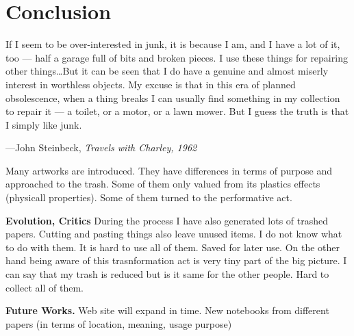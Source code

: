 \chapter{Conclusion}





%
%
\epigraph{If I seem to be over-interested in junk, it is because I am, and I have a lot of it, too --- half a garage full of bits and broken pieces. I use these things for repairing other things\ldots But it can be seen that I do have a genuine and almost miserly interest in worthless objects. My excuse is that in this era of planned obsolescence, when a thing breaks I can usually find something in my collection to repair it --- a toilet, or a motor, or a lawn mower. But I guess the truth is that I simply like junk.}{\hfill---John Steinbeck, \textit{Travels with Charley, 1962}}





%
%
Many artworks are introduced. They have differences in terms of purpose and approached to the trash. Some of them only valued from its plastics effects (physicall properties). Some of them turned to the performative act. 







%
%
\textbf{Evolution, Critics} During the process I have also generated lots of trashed papers. Cutting and pasting things also leave unused items. I do not know what to do with them. It is hard to use all of them. Saved for later use. On the other hand being aware of this trasnformation act is very tiny part of the big picture. I can say that my trash is reduced but is it same for the other people. Hard to collect all of them. 







%
%
\textbf{Future Works.} Web site will expand in time. New notebooks from different papers (in terms of location, meaning, usage purpose)


